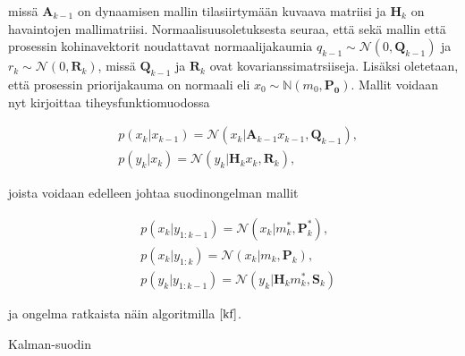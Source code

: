\documentclass[
  12pt,
  a4paper, twoside]{book}
\begin{document}
\noindent missä \(\mathbf{A}_{k-1}\) on dynaamisen mallin tilasiirtymään kuvaava matriisi ja \(\mathbf{H}_k\) on havaintojen mallimatriisi. Normaalisuusoletuksesta seuraa, että sekä mallin että prosessin kohinavektorit noudattavat normaalijakaumia \(q_{k-1} \sim \mathcal{N}(0, \mathbf{Q}_{k-1})\) ja \(r_k \sim \mathcal{N}(0, \mathbf{R}_k)\), missä \(\mathbf{Q}_{k-1}\) ja \(\mathbf{R}_k\) ovat kovarianssimatrsiiseja. Lisäksi oletetaan, että prosessin priorijakauma on normaali eli \(x_0 \sim \mathbb{N}(m_0, \mathbf{P_0})\). Mallit voidaan nyt kirjoittaa tiheysfunktiomuodossa

\begin{align}
&\label{kalman-malli-pdf1}p(x_k|x_{k-1})=\mathcal{N}(x_k|\mathbf{A}_{k-1}x_{k-1},\mathbf{Q}_{k-1}),\\
&\label{kalman-malli-pdf2}p(y_k|x_k)=\mathcal{N}(y_k|\mathbf{H}_{k}x_{k},\mathbf{R}_{k}),
\end{align}

\noindent joista voidaan edelleen johtaa suodinongelman mallit

\begin{align}
&\label{kalman-malli-suodin1}p(x_k|y_{1:k-1})=\mathcal{N}(x_k|m_k^* ,\mathbf{P}_k^*),\\
&\label{kalman-malli-suodin2}p(x_k|y_{1:k})=\mathcal{N}(x_k|m_k ,\mathbf{P}_k),\\
&\label{kalman-malli-suodin3}p(y_k|y_{1:k-1})=\mathcal{N}(y_k|\mathbf{H}_k m_k^* ,\mathbf{S}_k)
\end{align}

\noindent ja ongelma ratkaista näin algoritmilla \(\ref{kf}\).

\begin{algorithm}[H]
\label{kf}
\DontPrintSemicolon
\SetAlgoShortEnd
{}
\caption{Kalman-suodin}
\end{algorithm}
\end{document}
